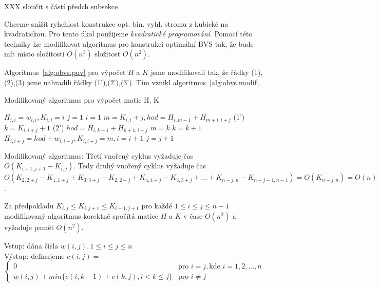 XXX sloučit s částí předch subsekce

Chceme snížit ryhchlost konstrukce opt. bin. vyhl. stromu z kubické na
kvadratickou. Pro tento úkol použijeme \emph{kvadratické programování}. 
Pomocí této techniky lze modifikovat algoritmus pro konstrukci optimální
BVS tak, že bude mít místo složitosti $O(n^3)$ složitost $O(n^2)$.

Algoritmus~\ref{alg:obvs.puv} pro výpočet $H$ a $K$ jsme modifikovali tak,
že řádky (1),(2),(3) jsme nahradili řádky (1'),(2'),(3'). Tím vznikl
algoritmus~\ref{alg:obvs.modif}.

\begin{algorithm}[!htb]
\caption{Modifikovaný algoritmus pro výpočet matic H, K}
\label{alg:obvs.modif}
\begin{algorithmic}
  \STATE $H_{i,i} = w_{i,i}, K_{i,i} = i$
\ENDFOR
\STATE $j = 1$
  \STATE $i = 1$
    \STATE $m = K_{i,i} + j, hod = H_{i,m-1} + H_{m+i,i+j}$ (1')
    \STATE $k = K_{i,i+j} + 1$ (2') 
        \STATE $hod = H_{i,k-1}+H_{k+1,i+j}$
	\STATE $m = k$
      \ENDIF
      \STATE $k = k + 1$
    \ENDWHILE
    \STATE $H_{i,i+j} = hod + w_{i,i+j}, K_{i,i+j} = m, i = i + 1$
  \ENDWHILE
  \STATE $j = j + 1$
\ENDWHILE
\end{algorithmic}
\end{algorithm}

Modifikovaný algoritmus: Třetí vnořený cyklus vyžaduje čas 
$O(K_{i+1,j+1} - K_{i,j})$. Tedy druhý vnořený cyklus vyžaduje čas 
$O(K_{2,2+j} - K_{1,1+j} + K_{3,3+j} - K_{2,2+j} + K_{4,4+j} - K_{3,3+j} +
... + K_{n-j,n} - K_{n-j-1,n-1}) = O(K_{n-j,n}) = O(n)$.

\begin{theorem}
Za předpokladu $K_{i,j} \leq K_{i,j+1} \leq K_{i+1,j+1}$ pro každé 
$1 \leq i \leq j \leq n - 1$ modifikovaný algoritmus korektně spočítá
matice $H$ a $K$ v čase $O(n^2)$ a vyžaduje paměť $O(n^2)$.
\end{theorem}



\par
Vstup: dána čísla $w(i,j), 1 \leq i \leq j \leq n$\\
Výstup: definujeme  $c(i,j) = $
 \(
 \begin{cases}
 	0
		&\text{pro } i=j, \text{kde } i = 1,2,..., n\\
	w(i,j) + min\{c(i,k-1) + c(k,j),
		i < k \leq j\}&\text{pro } i \neq j
 \end{cases}
 \)

